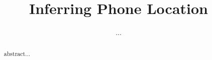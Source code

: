 \documentclass{article}
\begin{document}
\title{Inferring Phone Location}
\author{...}
\maketitle

\begin{abstract}
abstract...
\end{abstract}







\nocite{}



\end{document}
